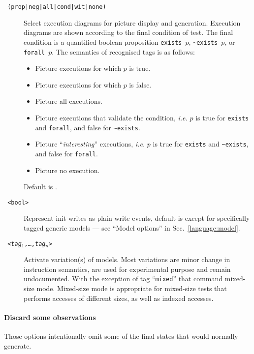 \begin{description}
\item[{\tt {} (prop|neg|all|cond|wit|none)}]
Select execution diagrams for picture display and generation.
Execution diagrams are shown according to
the final condition of test. The final condition is a quantified boolean
proposition \verb+exists +$p$, \verb+~exists +$p$, or \verb+forall +$p$.
The semantics of recognised tags is as follows:
\begin{itemize}
\item {} Picture executions for which $p$ is true.
\item {} Picture executions for which $p$ is false.
\item {}  Picture all executions.
\item {} Picture executions that validate  the condition,
\emph{i.e.} $p$ is true for \verb+exists+ and \verb+forall+, and false
for \verb+~exists+.
\item {} Picture ``\emph{interesting}'' executions,
\emph{i.e.} $p$ is true for \verb+exists+ and \verb+~exists+,
and false for \verb+forall+.
\item {} Picture no  execution.
\end{itemize}
Default is .

\item[{\tt {}  <bool>}]
Represent init writes as plain write events, default is  except
for specifically tagged generic models --- see ``Model options''
in Sec.~\ref{language:model}.

\item[{\tt {} <\textit{tag}$_1$,\ldots,\textit{tag}$_n$>}]
Activate variation(s) of models. Most variations are minor change in instruction semantics,
are used for experimental purpose and remain undocumented. With the exception of tag
``\texttt{mixed}'' that command mixed-size mode. Mixed-size mode is appropriate for mixed-size
tests that performs accesses of different sizes, as well as indexed accesses.

\end{description}

\paragraph*{Discard some observations}
Those options intentionally omit some of the final states that \herd{} would
normally generate.

